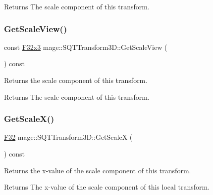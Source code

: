 \begin{DoxyReturn}{Returns}
The scale component of this transform. 
\end{DoxyReturn}
\mbox{\label{classmage_1_1_s_q_t_transform3_d_a9663b15b53a2e0ea4629f95e2e664d99}} 
\subsubsection{\texorpdfstring{Get\+Scale\+View()}{GetScaleView()}}
{\footnotesize\ttfamily const \mbox{\hyperlink{namespacemage_a1e3c7a882af461f161caa1cbddaf1fa2}{F32x3}} mage\+::\+S\+Q\+T\+Transform3\+D\+::\+Get\+Scale\+View (\begin{DoxyParamCaption}{ }\end{DoxyParamCaption}) const\hspace{0.3cm}{\ttfamily [noexcept]}}

Returns the scale component of this transform.

\begin{DoxyReturn}{Returns}
The scale component of this transform. 
\end{DoxyReturn}
\mbox{\label{classmage_1_1_s_q_t_transform3_d_afe7bd85c03cc9426b183841017df6d1c}} 
\subsubsection{\texorpdfstring{Get\+Scale\+X()}{GetScaleX()}}
{\footnotesize\ttfamily \mbox{\hyperlink{namespacemage_aa97e833b45f06d60a0a9c4fc22ae02c0}{F32}} mage\+::\+S\+Q\+T\+Transform3\+D\+::\+Get\+ScaleX (\begin{DoxyParamCaption}{ }\end{DoxyParamCaption}) const\hspace{0.3cm}{\ttfamily [noexcept]}}

Returns the x-\/value of the scale component of this transform.

\begin{DoxyReturn}{Returns}
The x-\/value of the scale component of this local transform. 
\end{DoxyReturn}
\mbox{\label{classmage_1_1_s_q_t_transform3_d_aaeb2da871b6bbff96c142333d3997cfa}} 
